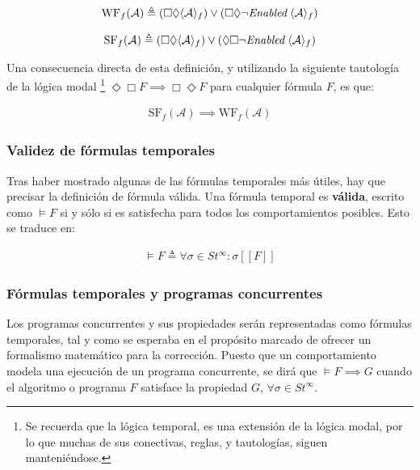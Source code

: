 \begin{align}
\text{WF}_f(\mathcal{A}) \triangleq (\Box\Diamond \langle \mathcal{A}\rangle_f) \lor (\Box\Diamond \neg \textit{Enabled} \hspace{0.1cm} \langle \mathcal{A}\rangle_f) 
\end{align}

\begin{align}
\text{SF}_f(\mathcal{A}) \triangleq (\Box\Diamond \langle \mathcal{A}\rangle_f) \lor (\Diamond\Box \neg \textit{Enabled} \hspace{0.1cm} \langle \mathcal{A}\rangle_f) 
\end{align}

Una consecuencia directa de esta definición, y utilizando la siguiente tautología de la lógica modal \footnote{Se recuerda que la lógica temporal, es una extensión de la lógica modal, por lo que muchas de sus conectivas, reglas, y tautologías, siguen manteniéndose.} $\Diamond\Box F \implies \Box\Diamond F$ para cualquier fórmula $F$, es que:

\begin{align}
\text{SF}_f(\mathcal{A}) \implies \text{WF}_f(\mathcal{A})
\end{align}

\subsubsection{Validez de fórmulas temporales}
Tras haber mostrado algunas de las fórmulas temporales más útiles, hay que precisar la definición de fórmula válida. Una fórmula temporal es \textbf{válida}, escrito como $\models F$ si y sólo si es satisfecha para todos los comportamientos posibles. Esto se traduce en:

\begin{align}
\models F \triangleq \forall \sigma \in St^\infty : \sigma[[F]]
\end{align}

\subsubsection{Fórmulas temporales y programas concurrentes}
Los programas concurrentes y sus propiedades serán representadas como fórmulas temporales, tal y como se esperaba en el propósito marcado de ofrecer un formalismo matemático para la corrección. Puesto que un comportamiento modela una ejecución de un programa concurrente, se dirá que $\models F \implies G$ cuando el algoritmo o programa $F$ satisface la propiedad $G$, $\forall \sigma \in St^\infty$.

